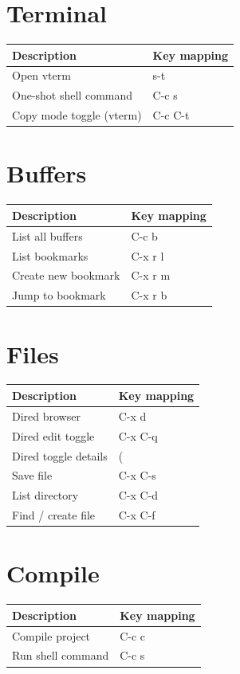 \documentclass[11pt]{article}
\begin{document}
\section{Terminal}
\label{sec:org9431505}

\begin{center}
\begin{tabular}{ll}
Description & Key mapping\\
\hline
Open vterm & s-t\\
One-shot shell command & C-c s\\
Copy mode toggle (vterm) & C-c C-t\\
\end{tabular}
\end{center}
\section{Buffers}
\label{sec:org6297bbb}

\begin{center}
\begin{tabular}{ll}
Description & Key mapping\\
\hline
List all buffers & C-c b\\
List bookmarks & C-x r l\\
Create new bookmark & C-x r m\\
Jump to bookmark & C-x r b\\
\end{tabular}
\end{center}
\section{Files}
\label{sec:orgc35ef4a}

\begin{center}
\begin{tabular}{ll}
Description & Key mapping\\
\hline
Dired browser & C-x d\\
Dired edit toggle & C-x C-q\\
Dired toggle details & (\\
Save file & C-x C-s\\
List directory & C-x C-d\\
Find / create file & C-x C-f\\
\end{tabular}
\end{center}
\section{Compile}
\label{sec:orgec1057b}

\begin{center}
\begin{tabular}{ll}
Description & Key mapping\\
\hline
Compile project & C-c c\\
Run shell command & C-c s\\
\end{tabular}
\end{center}
\end{document}
